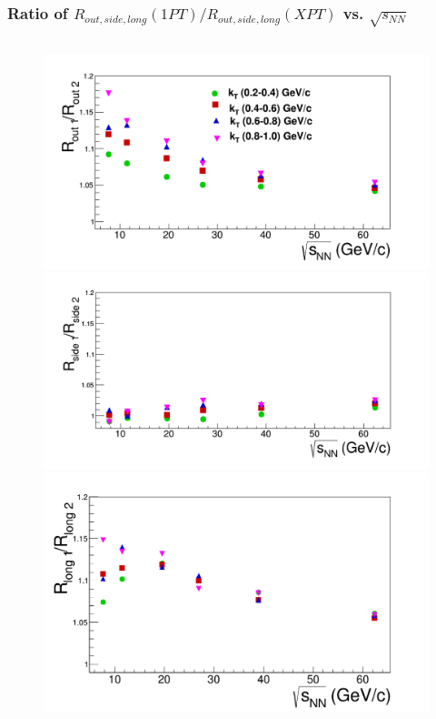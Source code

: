 \documentclass[dvipsnames] {beamer}
\begin{document}
      
      \begin{frame}
        \bf
        \frametitle{Ratio of $R_{out, side, long}(1PT) / R_{out, side, long}(XPT)$ vs. $\sqrt{s_{NN}}$}
        \vskip -0.75cm
        \begin{columns}[t]
          \begin{block}{}
             \begin{figure}[H]
               \includegraphics[width=1.0\linewidth]{Rout_diffEoS.png} \\
               \includegraphics[width=1.0\linewidth]{Rside_diffEoS.png} \\
               \includegraphics[width=1.0\linewidth]{Rlong_diffEoS.png}

\end{figure}
\end{block}
\end{columns}
\end{frame}
\end{document}
